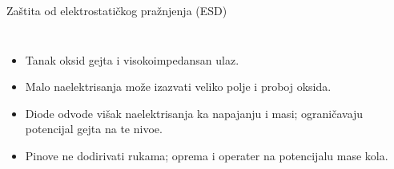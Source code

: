 \begin{frame}[label=09_2-s049]{Zaštita od elektrostatičkog pražnjenja (ESD)}
\begin{columns}[T,onlytextwidth]\centering {}\begin{itemize}
\item Tanak oksid gejta i visokoimpedansan ulaz.
\item Malo naelektrisanja može izazvati veliko polje i proboj oksida.
\item Diode odvode višak naelektrisanja ka napajanju i masi; ograničavaju potencijal gejta na te nivoe.
\item Pinove ne dodirivati rukama; oprema i operater na potencijalu mase kola.
\end{itemize}\end{columns}
\end{frame}
